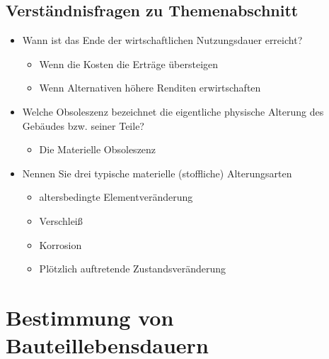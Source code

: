 \documentclass[fleqn,twoside,dvipsnames]{article}
\begin{document}
    \subsection{Verständnisfragen zu Themenabschnitt}
        \begin{itemize}
            \item Wann ist das Ende der wirtschaftlichen Nutzungsdauer erreicht?
                \begin{itemize}
                    \item Wenn die Kosten die Erträge übersteigen
                    \item Wenn Alternativen höhere Renditen erwirtschaften
                \end{itemize}
            \item Welche Obsoleszenz bezeichnet die eigentliche physische Alterung des Gebäudes bzw. seiner Teile?
                \begin{itemize}
                    \item Die Materielle Obsoleszenz
                \end{itemize}
            \item Nennen Sie drei typische materielle (stoffliche) Alterungsarten
                \begin{itemize}
                    \item altersbedingte Elementveränderung
                    \item Verschleiß
                    \item Korrosion
                    \item Plötzlich auftretende Zustandsveränderung
                \end{itemize}
        \end{itemize}

\newpage

\section{Bestimmung von Bauteillebensdauern} \label{BTLD}
    
\end{document}
